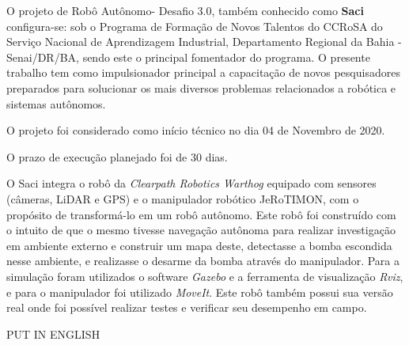 \documentclass[
12pt,					%
openright,				%
twoside,				%
a4paper,				%
english,
brazil
]{ABNT/abntex2_report}
\begin{document}
	\frenchspacing
	\imprimircapa
	\imprimircatalografica
	\ABNTEXchapterfont\large\textbf{\execsummarytitlename}
	\begin{flushleft}
		\normalsize
		\justify
		\normalfont
		O projeto de Robô Autônomo- Desafio 3.0, também conhecido como \textbf{Saci} configura-se: sob o Programa de Formação de Novos Talentos do \ac{CCRoSA} do Serviço Nacional de Aprendizagem Industrial, Departamento Regional da Bahia - Senai/DR/BA, sendo este o principal fomentador do programa.  O presente trabalho tem como impulsionador principal a capacitação de novos pesquisadores preparados para solucionar os mais diversos problemas relacionados a robótica e sistemas autônomos.

		O projeto foi considerado como início técnico no dia 04 de Novembro de 2020.  
		
		O prazo de execução planejado foi de 30 dias.
	\end{flushleft}
	\clearpage
	\ABNTEXchapterfont\large\textbf{\resumoatitlename}
	\begin{flushleft}
		\normalsize
		\justify
		\normalfont
		O Saci integra o robô da \textit{Clearpath Robotics Warthog} equipado com sensores (câmeras, LiDAR e GPS) e o manipulador robótico JeRoTIMON, com o propósito de transformá-lo em um robô autônomo. Este robô foi construído com o intuito de que o mesmo tivesse navegação autônoma para realizar investigação em ambiente externo e construir um mapa deste, detectasse a bomba escondida nesse ambiente, e realizasse o desarme da bomba através do manipulador. Para a simulação foram utilizados o software  \textit{Gazebo} e a ferramenta de visualização \textit{Rviz}, e para o manipulador foi utilizado \textit{MoveIt}. Este robô também possui sua versão real onde foi possível realizar testes e verificar seu desempenho em campo.		
	\end{flushleft}
	\vspace*{1cm}
	\newpage
	\ABNTEXchapterfont\large\textbf{\resumobtitlename}
	\begin{flushleft}
		\normalsize
		\justify
		\normalfont
		PUT IN ENGLISH
	\end{flushleft}
	\clearpage
\end{document}

